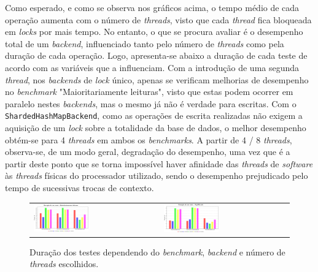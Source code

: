 \documentclass[11pt, a4paper]{article}
\begin{document}
Como esperado, e como se observa nos gráficos acima, o tempo médio de cada operação aumenta com o
número de \emph{threads}, visto que cada \emph{thread} fica bloqueada em \emph{locks} por mais
tempo. No entanto, o que se procura avaliar é o desempenho total de um \emph{backend}, influenciado
tanto pelo número de \emph{threads} como pela duração de cada operação. Logo, apresenta-se abaixo a
duração de cada teste de acordo com as variáveis que a influenciam. Com a introdução de uma segunda
\emph{thread}, nos \emph{backends} de \emph{lock} único, apenas se verificam melhorias de desempenho
no \emph{benchmark} "Maioritariamente leituras"{}, visto que estas podem ocorrer em paralelo nestes
\emph{backends}, mas o mesmo já não é verdade para escritas. Com o \texttt{ShardedHashMapBackend},
como as operações de escrita realizadas não exigem a aquisição de um \emph{lock} sobre a totalidade
da base de dados, o melhor desempenho obtém-se para 4 \emph{threads} em ambos os \emph{benchmarks}.
A partir de 4 / 8 \emph{threads}, observa-se, de um modo geral, degradação do desempenho, uma vez
que é a partir deste ponto que se torna impossível haver afinidade das \emph{threads} de
\emph{software} às \emph{threads} físicas do processador utilizado, sendo o desempenho prejudicado
pelo tempo de sucessivas trocas de contexto.

\begin{figure}[H]
    \centering
    \begin{longtable}{m{}m{}}
        \includegraphics[width=0.45\textwidth]{autogen/Maioritariamente_leituras.eps} &
        \includegraphics[width=0.45\textwidth]{autogen/Equilibrado.eps}
    \end{longtable}
    \caption{Duração dos testes dependendo do \emph{benchmark}, \emph{backend} e número de
        \emph{threads} escolhidos.}
    \label{time-graphs}
\end{figure}
\end{document}
